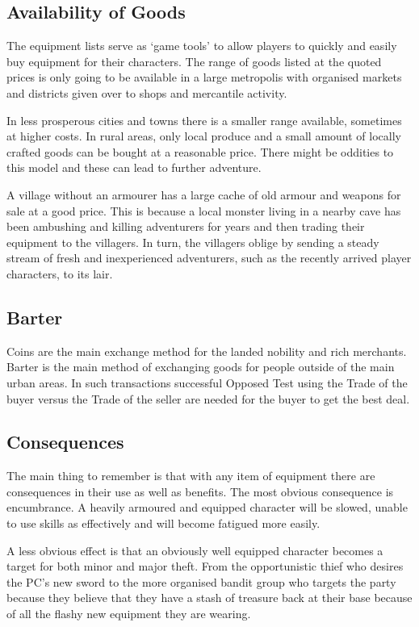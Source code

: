 \subsection{Availability of Goods}
The equipment lists serve as ‘game tools’ to allow players to quickly and easily buy equipment for their characters. The range of goods listed at the quoted prices is only going to be available in a large metropolis with organised markets and districts given over to shops and mercantile activity. 

In less prosperous cities and towns there is a smaller range available, sometimes at higher costs. In rural areas, only local produce and a small amount of locally crafted goods can be bought at a reasonable price. There might be oddities to this model and these can lead to further adventure. 

\begin{rpg-examplebox}
A village without an armourer has a large cache of old armour and weapons for sale at a good price. This is because a local monster living in a nearby cave has been ambushing and killing adventurers for years and then trading their equipment to the villagers. In turn, the villagers oblige by sending a steady stream of fresh and inexperienced adventurers, such as the recently arrived player characters, to its lair.
\end{rpg-examplebox}

\subsection{Barter}
Coins are the main exchange method for the landed nobility and rich merchants. Barter is the main method of exchanging goods for people outside of the main urban areas. In such transactions successful Opposed Test using the Trade of the buyer versus the Trade of the seller are needed for the buyer to get the best deal.

\subsection{Consequences}
The main thing to remember is that with any item of equipment there are consequences in their use as well as benefits. The most obvious consequence is encumbrance. A heavily armoured and equipped character will be slowed, unable to use skills as effectively and will become fatigued more easily.

A less obvious effect is that an obviously well equipped character becomes a target for both minor and major theft. From the opportunistic thief who desires the PC’s new sword to the more organised bandit group who targets the party because they believe that they have a stash of treasure back at their base because of all the flashy new equipment they are wearing.

